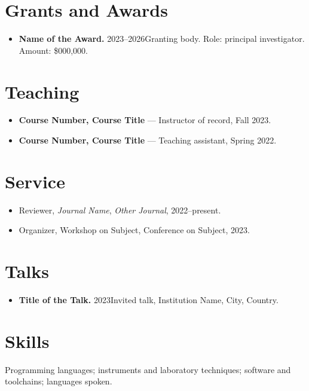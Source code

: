 \documentclass[11pt]{article}
\newcommand{\cvitem}[2]{\item \textbf{#1.} #2}
\begin{document}
\section{Grants and Awards}
\begin{itemize}
  \cvitem{Name of the Award}{2023--2026}{Granting body. Role: principal
        investigator. Amount: \$000,000.}
\end{itemize}

\section{Teaching}
\begin{itemize}
  \item \textbf{Course Number, Course Title} --- Instructor of record, Fall 2023.
  \item \textbf{Course Number, Course Title} --- Teaching assistant, Spring 2022.
\end{itemize}

\section{Service}
\begin{itemize}
  \item Reviewer, \emph{Journal Name}, \emph{Other Journal}, 2022--present.
  \item Organizer, Workshop on Subject, Conference on Subject, 2023.
\end{itemize}

\section{Talks}
\begin{itemize}
  \cvitem{Title of the Talk}{2023}{Invited talk, Institution Name, City, Country.}
\end{itemize}

\section{Skills}
Programming languages; instruments and laboratory techniques; software and
toolchains; languages spoken.
\end{document}
